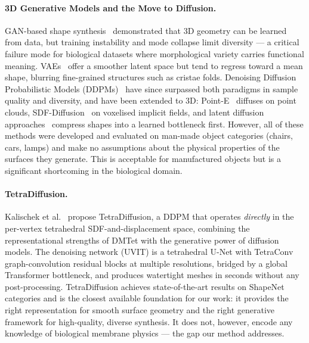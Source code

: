 \documentclass[10pt, a4paper, twocolumn]{article}
\begin{document}
\paragraph{3D Generative Models and the Move to Diffusion.}
GAN-based shape synthesis~\cite{goodfellow2014generative,wu2016learning} demonstrated that 3D geometry can be learned from data, but training instability and mode collapse limit diversity — a critical failure mode for biological datasets where morphological variety carries functional meaning. VAEs~\cite{kingma2013auto} offer a smoother latent space but tend to regress toward a mean shape, blurring fine-grained structures such as cristae folds. Denoising Diffusion Probabilistic Models (DDPMs)~\cite{ho2020denoising} have since surpassed both paradigms in sample quality and diversity, and have been extended to 3D: Point-E~\cite{nichol2022point} diffuses on point clouds, SDF-Diffusion~\cite{chou2023diffusion} on voxelised implicit fields, and latent diffusion approaches~\cite{rombach2022high,nam20223d} compress shapes into a learned bottleneck first. However, all of these methods were developed and evaluated on man-made object categories (chairs, cars, lamps) and make no assumptions about the physical properties of the surfaces they generate. This is acceptable for manufactured objects but is a significant shortcoming in the biological domain.

\paragraph{TetraDiffusion.}
Kalischek et al.\ \cite{kalischek2022tetradiffusion} propose TetraDiffusion, a DDPM that operates \emph{directly} in the per-vertex tetrahedral SDF-and-displacement space, combining the representational strengths of DMTet with the generative power of diffusion models. The denoising network (UVIT) is a tetrahedral U-Net with TetraConv graph-convolution residual blocks at multiple resolutions, bridged by a global Transformer bottleneck, and produces watertight meshes in seconds without any post-processing. TetraDiffusion achieves state-of-the-art results on ShapeNet categories and is the closest available foundation for our work: it provides the right representation for smooth surface geometry and the right generative framework for high-quality, diverse synthesis. It does not, however, encode any knowledge of biological membrane physics — the gap our method addresses.
\end{document}
